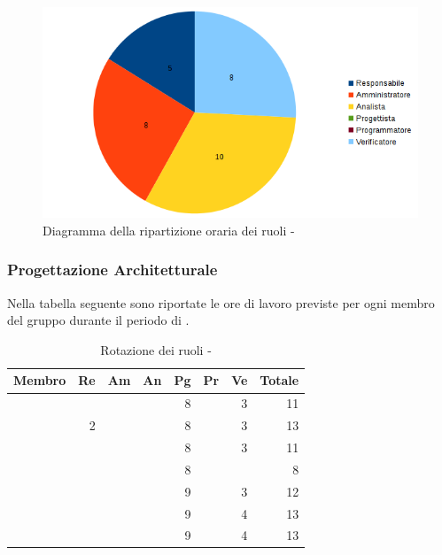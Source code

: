 \documentclass[12pt,a4paper]{article}
\begin{document}
\begin{center}
	\begin{figure}[H]
		\centering \includegraphics[width=\textwidth]{../img/diagrammaTortaAnalisiDiDettaglioTotaleOre.png}
		\caption{Diagramma della ripartizione oraria dei ruoli - \FAD{}}
	\end{figure}
\end{center}

\newpage
\subsubsection{Progettazione Architetturale}

Nella tabella seguente sono riportate le ore di lavoro previste per ogni membro del gruppo durante il periodo di \FP.

\begin{table}[H]
	\begin{center}
		\begin{tabular}{l r r r r r r r}
			\toprule
			\textbf{Membro}	&	\textbf{Re}	&	\textbf{Am}	& \textbf{An} & \textbf{Pg} & \textbf{Pr} & \textbf{Ve} & \textbf{Totale}\\
			\midrule
			\midrule
			\IB{} & & & & 8 & & 3 & 11 \\
			\midrule
			\AB{} & 2 & & & 8 & & 3 & 13 \\
			\midrule
			\NDC{} & & & & 8 & & 3 & 11 \\
			\midrule
			\TP{} & & & & 8 & & & 8 \\
			\midrule
			\WS{} & & & & 9 & & 3 & 12 \\
			\midrule
			\AVE{} & & & & 9 & & 4 & 13 \\
			\midrule
			\AVI{} & & & & 9 & & 4 & 13 \\
			\bottomrule
		\end{tabular}
		\caption{Rotazione dei ruoli - \FPA{}}
	\end{center}
\end{table}
\end{document}
